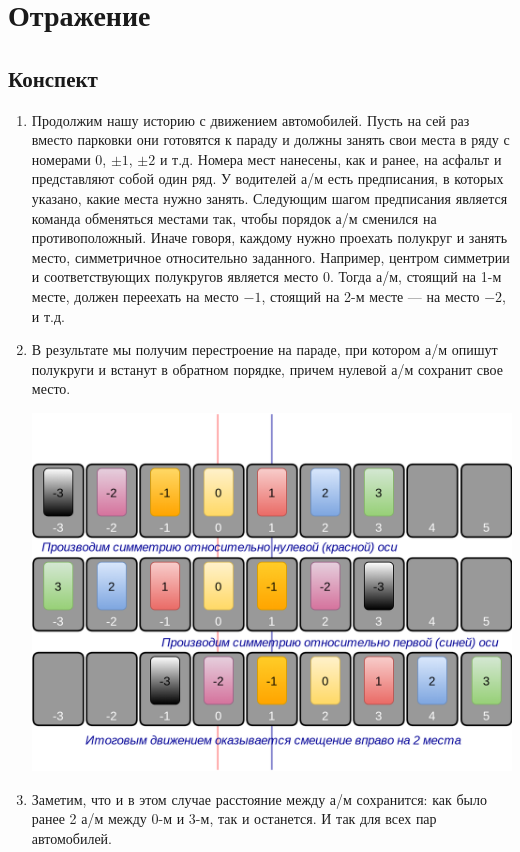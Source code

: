 \section{Отражение}

\subsection*{Конспект}
\begin{enumerate}\setlength{\itemsep}{1pt}
\item Продолжим нашу историю с движением автомобилей. Пусть на сей раз вместо парковки они готовятся к параду и должны занять свои места в ряду с номерами 0, $\pm 1$, $\pm 2$ и т.д. Номера мест нанесены, как и ранее, на асфальт и представляют собой один ряд. У водителей а/м есть предписания, в которых указано, какие места нужно занять. Следующим шагом предписания является команда обменяться местами так, чтобы порядок а/м сменился на противоположный. Иначе говоря, каждому нужно проехать полукруг и занять место, симметричное относительно заданного. Например, центром симметрии и соответствующих полукругов является место 0. Тогда а/м, стоящий на 1-м месте, должен переехать на место $-1$, стоящий на 2-м месте --- на место $-2$, и т.д.
\item В результате мы получим перестроение на параде, при котором а/м опишут полукруги и встанут в обратном порядке, причем нулевой а/м сохранит свое место.
\begin{center}
\includegraphics[scale=0.6]{SST.png}
\end{center}
\item Заметим, что и в этом случае расстояние между а/м сохранится: как было ранее 2 а/м между 0-м и 3-м, так и останется. И так для всех пар автомобилей.

\end{enumerate}
